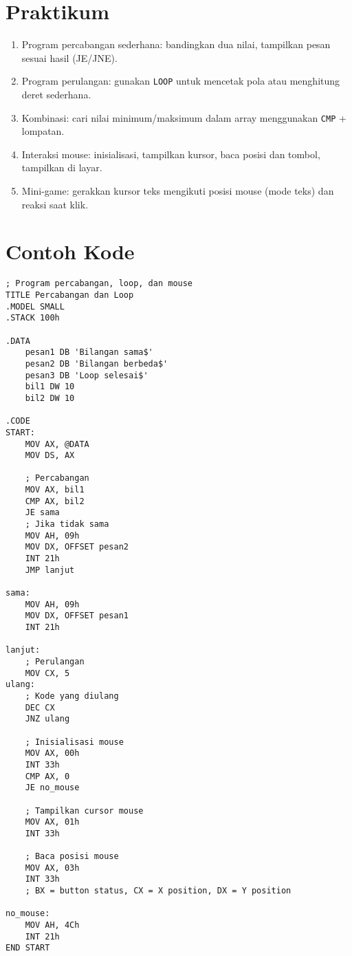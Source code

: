 \documentclass[../main.tex]{subfiles}
\begin{document}
\section{Praktikum}
\begin{enumerate}
  \item Program percabangan sederhana: bandingkan dua nilai, tampilkan pesan sesuai hasil (JE/JNE).
  \item Program perulangan: gunakan \texttt{LOOP} untuk mencetak pola atau menghitung deret sederhana.
  \item Kombinasi: cari nilai minimum/maksimum dalam array menggunakan \texttt{CMP} + lompatan.
  \item Interaksi mouse: inisialisasi, tampilkan kursor, baca posisi dan tombol, tampilkan di layar.
  \item Mini-game: gerakkan kursor teks mengikuti posisi mouse (mode teks) dan reaksi saat klik.
\end{enumerate}

\section{Contoh Kode}
\begin{verbatim}
; Program percabangan, loop, dan mouse
TITLE Percabangan dan Loop
.MODEL SMALL
.STACK 100h

.DATA
    pesan1 DB 'Bilangan sama$'
    pesan2 DB 'Bilangan berbeda$'
    pesan3 DB 'Loop selesai$'
    bil1 DW 10
    bil2 DW 10

.CODE
START:
    MOV AX, @DATA
    MOV DS, AX
    
    ; Percabangan
    MOV AX, bil1
    CMP AX, bil2
    JE sama
    ; Jika tidak sama
    MOV AH, 09h
    MOV DX, OFFSET pesan2
    INT 21h
    JMP lanjut
    
sama:
    MOV AH, 09h
    MOV DX, OFFSET pesan1
    INT 21h
    
lanjut:
    ; Perulangan
    MOV CX, 5
ulang:
    ; Kode yang diulang
    DEC CX
    JNZ ulang
    
    ; Inisialisasi mouse
    MOV AX, 00h
    INT 33h
    CMP AX, 0
    JE no_mouse
    
    ; Tampilkan cursor mouse
    MOV AX, 01h
    INT 33h
    
    ; Baca posisi mouse
    MOV AX, 03h
    INT 33h
    ; BX = button status, CX = X position, DX = Y position
    
no_mouse:
    MOV AH, 4Ch
    INT 21h
END START
\end{verbatim}
\end{document}
